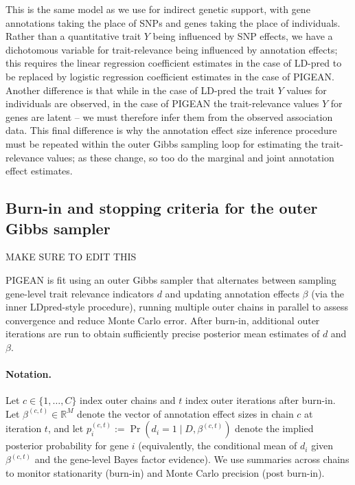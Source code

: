 \documentclass[11pt]{article}
\begin{document}
This is the same model as we use for indirect genetic support, with
gene annotations taking the place of SNPs and genes taking the place
of individuals. Rather than a quantitative
trait $Y$ being influenced by SNP effects, we have a dichotomous
variable for trait-relevance being influenced by annotation effects;
this requires the linear regression coefficient estimates in the case
of LD-pred to be replaced by logistic regression coefficient estimates
in the case of PIGEAN. Another difference is that while in the case of
LD-pred the trait $Y$ values for individuals are observed, in the case
of PIGEAN the trait-relevance values $Y$ for genes are latent -- we
must therefore infer them from the observed association data. This
final difference is why the annotation effect size inference procedure
must be repeated within the outer Gibbs sampling loop for estimating
the trait-relevance values; as these change, so too do the marginal
and joint annotation effect estimates.

\subsection{Burn-in and stopping criteria for the outer Gibbs sampler}

{\color{blue} MAKE SURE TO EDIT THIS}

\label{sec:outer_gibbs_stopping}

PIGEAN is fit using an outer Gibbs sampler that alternates between sampling gene-level trait
relevance indicators $d$ and updating annotation effects $\beta$ (via the inner LDpred-style
procedure), running multiple outer chains in parallel to assess convergence and reduce Monte Carlo
error. After burn-in, additional outer iterations are run to obtain sufficiently precise posterior mean
estimates of $d$ and $\beta$.

\paragraph{Notation.}
Let $c \in \{1,\dots,C\}$ index outer chains and $t$ index outer iterations after burn-in.
Let $\beta^{(c,t)} \in \mathbb{R}^M$ denote the vector of annotation effect sizes in chain $c$ at iteration
$t$, and let $p^{(c,t)}_i := \Pr(d_i = 1 \mid D, \beta^{(c,t)})$ denote the implied posterior probability for
gene $i$ (equivalently, the conditional mean of $d_i$ given $\beta^{(c,t)}$ and the gene-level Bayes
factor evidence). We use summaries across chains to monitor stationarity (burn-in) and Monte Carlo
precision (post burn-in).
\end{document}
